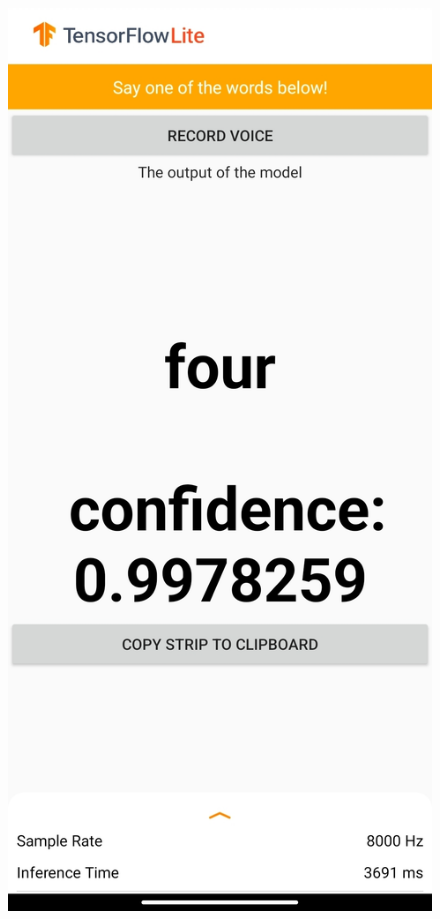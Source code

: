 \documentclass{report}
\theoremstyle{definition}
\theoremstyle{remark}
\begin{document}
\begin{figure}
    \centering
    \includegraphics[scale=0.4]{img/app.jpg}
    \label{fig:theApp}
\end{figure}
\end{document}
